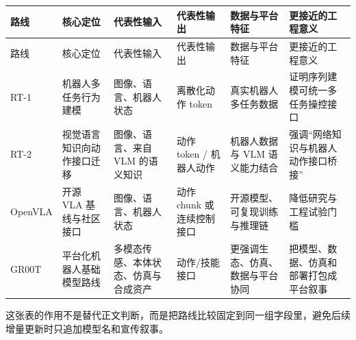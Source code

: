 \begingroup
\small
\begin{xltabular}{\textwidth}{YYYYYY}
\toprule
路线 & 核心定位 & 代表性输入 & 代表性输出 & 数据与平台特征 & 更接近的工程意义 \\
\midrule
\endfirsthead
\toprule
路线 & 核心定位 & 代表性输入 & 代表性输出 & 数据与平台特征 & 更接近的工程意义 \\
\midrule
\endhead
RT-1 & 机器人多任务行为建模 & 图像、语言、机器人状态 & 离散化动作 token & 真实机器人多任务数据 & 证明序列建模可统一多任务操控接口 \\
RT-2 & 视觉语言知识向动作接口迁移 & 图像、语言、来自 VLM 的语义知识 & 动作 token / 机器人动作 & 机器人数据与 VLM 语义能力结合 & 强调“网络知识与机器人动作接口桥接” \\
OpenVLA & 开源 VLA 基线与社区接口 & 图像、语言、机器人状态 & 动作 chunk 或连续控制接口 & 开源模型、可复现训练与推理链 & 降低研究与工程试验门槛 \\
GR00T & 平台化机器人基础模型路线 & 多模态传感、本体状态、仿真与合成资产 & 动作/技能接口 & 更强调生态、仿真、数据与平台协同 & 把模型、数据、仿真和部署打包成平台叙事 \\
\bottomrule
\end{xltabular}
\endgroup

这张表的作用不是替代正文判断，而是把路线比较固定到同一组字段里，避免后续增量更新时只追加模型名和宣传叙事。
